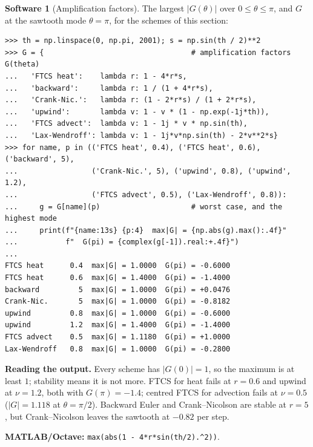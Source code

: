 \documentclass[11pt,a4paper]{article}
\numberwithin{equation}{section}
\theoremstyle{definition}
\newtheorem{software}[thm]{Software}
\begin{document}
\begin{software}[Amplification factors]
\label{sw:amplification}
The largest $|G(\theta)|$ over $0 \leq \theta \leq \pi$, and $G$ at the sawtooth mode $\theta = \pi$, for the schemes of this section:
{\small\begin{verbatim}
>>> th = np.linspace(0, np.pi, 2001); s = np.sin(th / 2)**2
>>> G = {                                  # amplification factors G(theta)
...   'FTCS heat':    lambda r: 1 - 4*r*s,
...   'backward':     lambda r: 1 / (1 + 4*r*s),
...   'Crank-Nic.':   lambda r: (1 - 2*r*s) / (1 + 2*r*s),
...   'upwind':       lambda v: 1 - v * (1 - np.exp(-1j*th)),
...   'FTCS advect':  lambda v: 1 - 1j * v * np.sin(th),
...   'Lax-Wendroff': lambda v: 1 - 1j*v*np.sin(th) - 2*v**2*s}
>>> for name, p in (('FTCS heat', 0.4), ('FTCS heat', 0.6), ('backward', 5),
...                 ('Crank-Nic.', 5), ('upwind', 0.8), ('upwind', 1.2),
...                 ('FTCS advect', 0.5), ('Lax-Wendroff', 0.8)):
...     g = G[name](p)                     # worst case, and the highest mode
...     print(f"{name:13s} {p:4}  max|G| = {np.abs(g).max():.4f}"
...           f"  G(pi) = {complex(g[-1]).real:+.4f}")
...
FTCS heat      0.4  max|G| = 1.0000  G(pi) = -0.6000
FTCS heat      0.6  max|G| = 1.4000  G(pi) = -1.4000
backward         5  max|G| = 1.0000  G(pi) = +0.0476
Crank-Nic.       5  max|G| = 1.0000  G(pi) = -0.8182
upwind         0.8  max|G| = 1.0000  G(pi) = -0.6000
upwind         1.2  max|G| = 1.4000  G(pi) = -1.4000
FTCS advect    0.5  max|G| = 1.1180  G(pi) = +1.0000
Lax-Wendroff   0.8  max|G| = 1.0000  G(pi) = -0.2800
\end{verbatim}}
\textbf{Reading the output.} Every scheme has $|G(0)| = 1$, so the maximum is at least $1$; stability means it is not more. FTCS for heat fails at $r = 0.6$ and upwind at $\nu = 1.2$, both with $G(\pi) = -1.4$; centred FTCS for advection fails at $\nu = 0.5$ ($|G| = 1.118$ at $\theta = \pi/2$). Backward Euler and Crank--Nicolson are stable at $r = 5$, but
Crank--Nicolson leaves the sawtooth at $-0.82$ per step.

\textbf{MATLAB/Octave:} \texttt{max(abs(1 - 4*r*sin(th/2).\^{}2))}.
\end{software}
\end{document}
